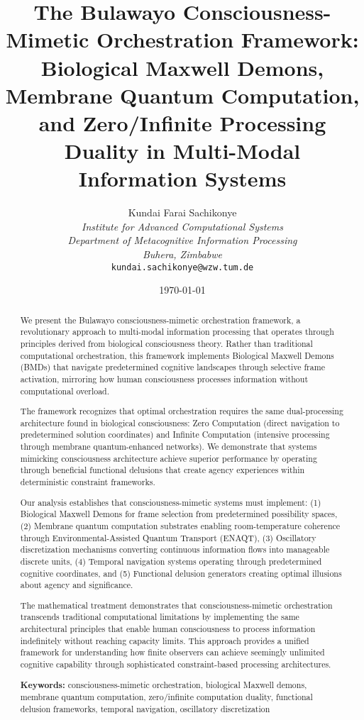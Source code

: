 \documentclass[12pt,a4paper]{article}
\title{\textbf{The Bulawayo Consciousness-Mimetic Orchestration Framework: Biological Maxwell Demons, Membrane Quantum Computation, and Zero/Infinite Processing Duality in Multi-Modal Information Systems}}
\author{
Kundai Farai Sachikonye\\
\textit{Institute for Advanced Computational Systems}\\
\textit{Department of Metacognitive Information Processing}\\
\textit{Buhera, Zimbabwe}\\
\texttt{kundai.sachikonye@wzw.tum.de}
}
\date{\today}
\begin{document}
\maketitle

\begin{abstract}
We present the Bulawayo consciousness-mimetic orchestration framework, a revolutionary approach to multi-modal information processing that operates through principles derived from biological consciousness theory. Rather than traditional computational orchestration, this framework implements Biological Maxwell Demons (BMDs) that navigate predetermined cognitive landscapes through selective frame activation, mirroring how human consciousness processes information without computational overload.

The framework recognizes that optimal orchestration requires the same dual-processing architecture found in biological consciousness: Zero Computation (direct navigation to predetermined solution coordinates) and Infinite Computation (intensive processing through membrane quantum-enhanced networks). We demonstrate that systems mimicking consciousness architecture achieve superior performance by operating through beneficial functional delusions that create agency experiences within deterministic constraint frameworks.

Our analysis establishes that consciousness-mimetic systems must implement: (1) Biological Maxwell Demons for frame selection from predetermined possibility spaces, (2) Membrane quantum computation substrates enabling room-temperature coherence through Environmental-Assisted Quantum Transport (ENAQT), (3) Oscillatory discretization mechanisms converting continuous information flows into manageable discrete units, (4) Temporal navigation systems operating through predetermined cognitive coordinates, and (5) Functional delusion generators creating optimal illusions about agency and significance.

The mathematical treatment demonstrates that consciousness-mimetic orchestration transcends traditional computational limitations by implementing the same architectural principles that enable human consciousness to process information indefinitely without reaching capacity limits. This approach provides a unified framework for understanding how finite observers can achieve seemingly unlimited cognitive capability through sophisticated constraint-based processing architectures.

\textbf{Keywords:} consciousness-mimetic orchestration, biological Maxwell demons, membrane quantum computation, zero/infinite computation duality, functional delusion frameworks, temporal navigation, oscillatory discretization
\end{abstract}
\end{document}
